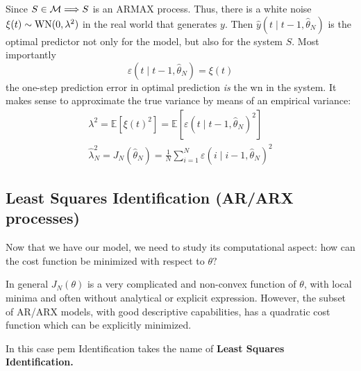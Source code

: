 Since $ S\in \mathcal{M} \Longrightarrow S$ is an ARMAX process. Thus, there is a white noise $ \xi (t) \sim \operatorname{WN}(0,\lambda ^{2})$ in the real world that generates $y$. Then $ \hat{y}(t\mid t-1,\hat{\theta }_{N})$ is the optimal predictor not only for the model, but also for the system $S$. Most importantly
\begin{equation*}
\varepsilon (t\mid t-1,\hat{\theta }_{N}) =\xi (t)
\end{equation*}
the one-step prediction error in optimal prediction \textit{is} the \gls{wn} in the system. It makes sense to approximate the true variance by means of an empirical variance:
\begin{gather*}
\lambda ^{2} =\mathbb{E}\left[ \xi (t)^{2}\right] =\mathbb{E}[ \varepsilon (t\mid t-1,\hat{\theta }_{N})^2]\\
\hat{\lambda }_{N}^{2} =J_{N}(\hat{\theta }_{N}) =\frac{1}{N}\sum _{i=1}^{N} \varepsilon (i\mid i-1,\hat{\theta }_{N})^{2}
\end{gather*}

\subsection{Least Squares Identification (AR/ARX processes)}
Now that we have our model, we need to study its computational aspect: how can the cost function be minimized with respect to $ \theta ?$

In general $ J_{N}(\theta)$ is a very complicated and non-convex function of $ \theta $, with local minima and often without analytical or explicit expression. However, the subset of AR/ARX models, with good descriptive capabilities, has a quadratic cost function which can be explicitly minimized.

In this case \gls{pem} Identification takes the name of \textbf{Least Squares Identification.}

